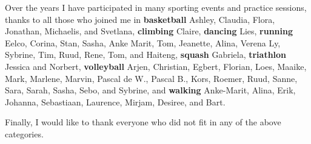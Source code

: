

Over the years I have participated in many sporting events and practice sessions, thanks to all those who joined me in 
\textbf{basketball} Ashley, Claudia, Flora, Jonathan, Michaelis, and Svetlana,
\textbf{climbing} Claire,
\textbf{dancing} Lies,
\textbf{running} Eelco, Corina, Stan, Sasha, Anke Marit, Tom, Jeanette, Alina, Verena Ly, Sybrine, Tim, Ruud, Rene, Tom, and Haiteng,
\textbf{squash} Gabriela,
\textbf{triathlon} Jessica and Norbert, 
\textbf{volleyball} Arjen, Christian, Egbert, Florian, Loes, Maaike, Mark, Marlene, Marvin, Pascal de W., Pascal B., Kors, Roemer, Ruud, Sanne, Sara, Sarah, Sasha, Sebo, and Sybrine, 
and 
\textbf{walking} Anke-Marit, Alina, Erik, Johanna, Sebastiaan, Laurence, Mirjam, Desiree, and Bart.

Finally, I would like to thank everyone who did not fit in any of the above categories.

